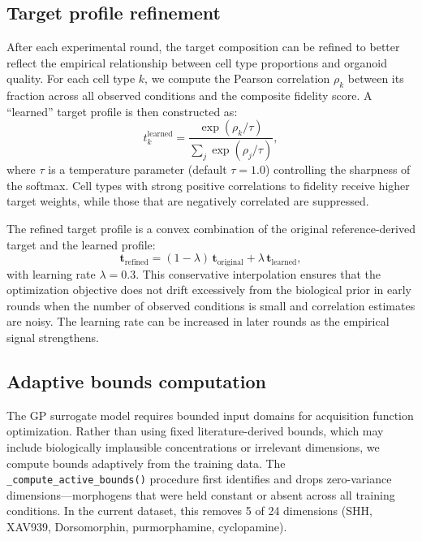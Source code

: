 \documentclass[times,twoside]{zHenriquesLab-StyleBioRxiv}
\begin{document}
\subsection*{Target profile refinement}

After each experimental round, the target composition can be refined to better reflect the empirical relationship between cell type proportions and organoid quality. For each cell type $k$, we compute the Pearson correlation $\rho_k$ between its fraction across all observed conditions and the composite fidelity score. A ``learned'' target profile is then constructed as:
\begin{equation}
  t_k^\text{learned} = \frac{\exp(\rho_k / \tau)}{\sum_{j} \exp(\rho_j / \tau)},
\end{equation}
where $\tau$ is a temperature parameter (default $\tau{=}1.0$) controlling the sharpness of the softmax. Cell types with strong positive correlations to fidelity receive higher target weights, while those that are negatively correlated are suppressed.

The refined target profile is a convex combination of the original reference-derived target and the learned profile:
\begin{equation}
  \bm{t}_\text{refined} = (1 - \lambda)\,\bm{t}_\text{original} + \lambda\,\bm{t}_\text{learned},
\end{equation}
with learning rate $\lambda{=}0.3$. This conservative interpolation ensures that the optimization objective does not drift excessively from the biological prior in early rounds when the number of observed conditions is small and correlation estimates are noisy. The learning rate can be increased in later rounds as the empirical signal strengthens.

\subsection*{Adaptive bounds computation}

The GP surrogate model requires bounded input domains for acquisition function optimization. Rather than using fixed literature-derived bounds, which may include biologically implausible concentrations or irrelevant dimensions, we compute bounds adaptively from the training data. The \texttt{\_compute\_active\_bounds()} procedure first identifies and drops zero-variance dimensions---morphogens that were held constant or absent across all training conditions. In the current dataset, this removes 5 of 24 dimensions (SHH, XAV939, Dorsomorphin, purmorphamine, cyclopamine).
\end{document}

